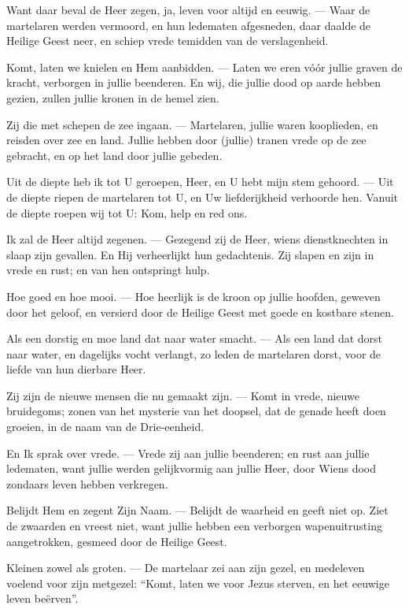 \documentclass[12pt,twoside,a5paper]{article}
\newlength{\origparskip}
\newenvironment{halfparskip}{
  \setlength{\parskip}{0.5\origparskip}
}{
  \setlength{\parskip}{\origparskip}
}
\begin{document}
\begin{halfparskip}
  Want daar beval de Heer zegen, ja, leven voor altijd en eeuwig. --- Waar de martelaren werden vermoord, en hun ledematen afgesneden, daar daalde de Heilige Geest neer, en schiep vrede temidden van de verslagenheid.

  Komt, laten we knielen en Hem aanbidden. --- Laten we eren vóór jullie graven de kracht, verborgen in jullie beenderen. En wij, die jullie dood op aarde hebben gezien, zullen jullie kronen in de hemel zien.

  Zij die met schepen de zee ingaan. --- Martelaren, jullie waren kooplieden, en reisden over zee en land. Jullie hebben door (jullie) tranen vrede op de zee gebracht, en op het land door jullie gebeden.

  Uit de diepte heb ik tot U geroepen, Heer, en U hebt mijn stem gehoord. --- Uit de diepte riepen de martelaren tot U, en Uw liefderijkheid verhoorde hen. Vanuit de diepte roepen wij tot U: Kom, help en red ons.

  Ik zal de Heer altijd zegenen. --- Gezegend zij de Heer, wiens dienstknechten in slaap zijn gevallen. En Hij verheerlijkt hun gedachtenis. Zij slapen en zijn in vrede en rust; en van hen ontspringt hulp.

  Hoe goed en hoe mooi. --- Hoe heerlijk is de kroon op jullie hoofden, geweven door het geloof, en versierd door de Heilige Geest met goede en kostbare stenen.

  Als een dorstig en moe land dat naar water smacht. --- Als een land dat dorst naar water, en dagelijks vocht verlangt, zo leden de martelaren dorst, voor de liefde van hun dierbare Heer.

  Zij zijn de nieuwe mensen die nu gemaakt zijn. --- Komt in vrede, nieuwe bruidegoms; zonen van het mysterie van het doopsel, dat de genade heeft doen groeien, in de naam van de Drie-eenheid.

  En Ik sprak over vrede. --- Vrede zij aan jullie beenderen; en rust aan jullie ledematen, want jullie werden gelijkvormig aan jullie Heer, door Wiens dood zondaars leven hebben verkregen.

  Belijdt Hem en zegent Zijn Naam. --- Belijdt de waarheid en geeft niet op. Ziet de zwaarden en vreest niet, want jullie hebben een verborgen wapenuitrusting aangetrokken, gesmeed door de Heilige Geest.

  Kleinen zowel als groten. --- De martelaar zei aan zijn gezel, en medeleven voelend voor zijn metgezel: ``Komt, laten we voor Jezus sterven, en het eeuwige leven beërven''.


\end{halfparskip}
\end{document}
